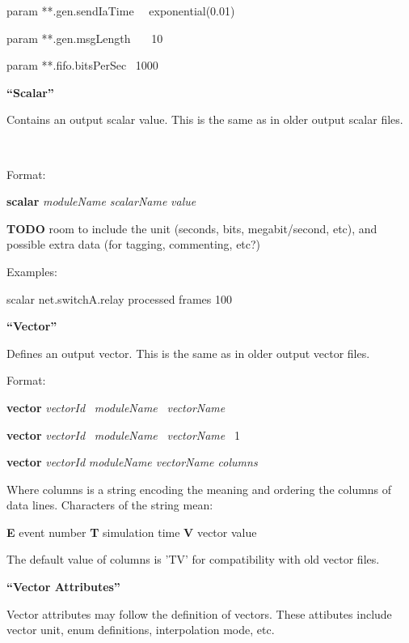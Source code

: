 {\ttfamily
param **.gen.sendIaTime \ \ exponential(0.01)}

{\ttfamily
param **.gen.msgLength \ \ \ 10}

{\ttfamily
param **.fifo.bitsPerSec \ 1000}


\bigskip

{\bfseries
``Scalar''}

Contains an output scalar value. This is the same as in older output
scalar files.

\

Format:

\textbf{scalar} \textit{moduleName} \textit{scalarName} \textit{value}


\bigskip

\textbf{TODO} room to include the unit (seconds, bits, megabit/second,
etc), and possible extra data (for tagging, commenting, etc?)


\bigskip

Examples:

{\ttfamily
scalar {\textquotedbl}net.switchA.relay{\textquotedbl}
{\textquotedbl}processed frames{\textquotedbl} 100}


\bigskip

{\bfseries
``Vector''}

Defines an output vector. This is the same as in older output vector
files.

Format:

\textbf{vector} \textit{vectorId} \ \textit{moduleName}
\ \textit{vectorName}

\textbf{vector} \textit{vectorId} \ \textit{moduleName}
\ \textit{vectorName} \ 1

\textbf{vector }\textit{vectorId} \textit{moduleName vectorName columns}


\textit{ }Where columns is a string encoding the meaning and ordering
the columns of data lines. Characters of the string mean:

  \textbf{E} event number
  \textbf{T} simulation time
  \textbf{V} vector value

The default value of columns is 'TV'
for compatibility with old vector files.


\bigskip

{\bfseries
``Vector Attributes''}

Vector attributes may follow the definition of vectors. These attibutes
include vector unit, enum definitions, interpolation mode, etc.


\bigskip


